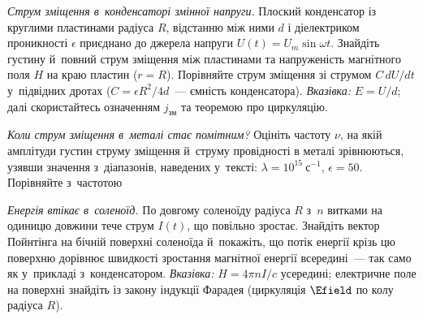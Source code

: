  {}

\begin{problem}\label{prb:CapacitorDisplacementAC}
	\emph{Струм зміщення в~конденсаторі змінної напруги.} Плоский конденсатор із круглими
	пластинами радіуса $R$, відстанню між ними $d$ і діелектриком проникності $\epsilon$
	приєднано до джерела напруги $U(t)=U_m\sin\omega t$. Знайдіть густину й~повний струм
	зміщення між пластинами та напруженість магнітного поля $H$ на краю пластин ($r=R$).
	Порівняйте струм зміщення зі струмом $C\,dU/dt$ у~підвідних дротах ($C=\epsilon
	R^2/4d$~--- ємність конденсатора). \emph{Вказівка:} $E=U/d$; далі скористайтесь
	означенням $j_\text{зм}$ та теоремою про циркуляцію.
\end{problem}

\begin{problem}\label{prb:MetalDisplacementFreq}
	\emph{Коли струм зміщення в~металі стає помітним?} Оцініть частоту $\nu$, на якій
	амплітуди густин струму зміщення й~струму провідності в металі зрівнюються, узявши
	значення з~діапазонів, наведених у~тексті: $\lambda=10^{15}~\text{с}^{-1}$,
	$\epsilon=50$. Порівняйте з~частотою
\end{problem}

\begin{problem}\label{prb:SolenoidPoynting}
	\emph{Енергія втікає в~соленоїд.} По довгому соленоїду радіуса $R$ з~$n$ витками на
	одиницю довжини тече струм $I(t)$, що повільно зростає. Знайдіть вектор Пойнтінга на
	бічній поверхні соленоїда й~покажіть, що потік енергії крізь цю поверхню дорівнює
	швидкості зростання магнітної енергії всередині~--- так само як у~прикладі
	з~конденсатором. \emph{Вказівка:} $H=4\pi nI/c$ усередині; електричне поле на
	поверхні знайдіть із закону індукції Фарадея (циркуляція $\Efield$ по колу радіуса
	$R$).
\end{problem}

